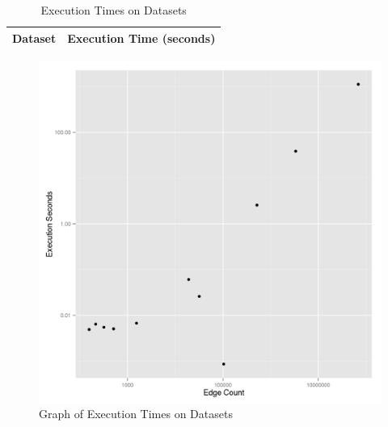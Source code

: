 \documentclass{report}
\begin{document}
\begin{table}
  \centering
  \begin{tabular}{ll}
    \toprule
    Dataset & Execution Time (seconds)\\
    \midrule
    
    \bottomrule
  \end{tabular}
  \caption{Execution Times on Datasets}
  \label{execution-times-table}
\end{table}
\begin{figure}
  \centering
  \includegraphics[scale=0.5]{performance.png}
  \caption{Graph of Execution Times on Datasets}
  \label{execution-times-graph}
\end{figure}
\end{document}
